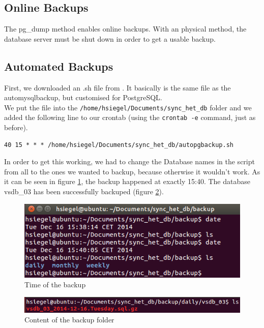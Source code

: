 \documentclass[10pt]{article}
\begin{document}
\subsection{Online Backups}
The pg\_dump method enables online backups.
With an physical method, the database server must be shut down in order to get a usable backup.
\subsection{Automated Backups}
First, we downloaded an .sh file from \cite{autppg}. It basically is the same file as the automysqlbackup, but customised for PostgreSQL. \\
We put the file into the \texttt{/home/hsiegel/Documents/sync\_het\_db} folder and we added the following line to our crontab (using the \texttt{crontab -e} command, just as before). 
\begin{lstlisting}    
40 15 * * * /home/hsiegel/Documents/sync_het_db/autopgbackup.sh
\end{lstlisting}    
In order to get this working, we had to change the Database names in the script from all to the ones we wanted to backup, because otherwise it wouldn't work. As it can be seen in figure \ref{fig:b1}, the backup happened at exactly 15:40. The database vsdb\_03 has been successfully backuped (figure \ref{fig:b2}).  
\begin{figure}[!h]
	\begin{center}
		\includegraphics[width=0.5\linewidth]{pictures/pgbackupaut}
		\caption{Time of the backup}
		\label{fig:b1}
	\end{center}
\end{figure} 
\begin{figure}[!h]
	\begin{center}
		\includegraphics[width=0.5\linewidth]{pictures/pgbackupaut2}
		\caption{Content of the backup folder}
		\label{fig:b2}
	\end{center}
\end{figure} 
\newpage
\end{document}
